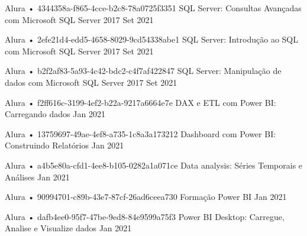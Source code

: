 \begin{cventries}
  \cventry
    {Alura • 4344358a-f865-4cce-b2c8-78a0725f3351} %
    {SQL Server: Consultas Avançadas com Microsoft SQL Server 2017} %
    {} %
    {Set 2021} %
    {}

  \cventry
    {Alura • 2efe21d4-edd5-4658-8029-9cd54338abe1} %
    {SQL Server: Introdução ao SQL com Microsoft SQL Server 2017} %
    {} %
    {Set 2021} %
    {}

  \cventry
    {Alura • b2f2af83-5a93-4c42-bdc2-c4f7af422847} %
    {SQL Server: Manipulação de dados com Microsoft SQL Server 2017} %
    {} %
    {Set 2021} %
    {}

  \cventry
    {Alura • f2ff616c-3199-4ef2-b22a-9217a6664e7e} %
    {DAX e ETL com Power BI: Carregando dados} %
    {} %
    {Jan 2021} %
    {}

  \cventry
    {Alura • 13759697-49ae-4ef8-a735-1c8a3a173212} %
    {Dashboard com Power BI: Construindo Relatórios} %
    {} %
    {Jan 2021} %
    {}

  \cventry
    {Alura • a4b5e80a-cfd1-4ee8-b105-0282a1a071ce} %
    {Data analysis: Séries Temporais e Análises} %
    {} %
    {Jan 2021} %
    {}

  \cventry
    {Alura • 90994701-c89b-43e7-87cf-26ad6ceea730} %
    {Formação Power BI} %
    {} %
    {Jan 2021} %
    {}

  \cventry
    {Alura • dafb4ee0-95f7-47be-9ed8-84e9599a75f3} %
    {Power BI Desktop: Carregue, Analise e Visualize dados} %
    {} %
    {Jan 2021} %
    {}


\end{cventries}
